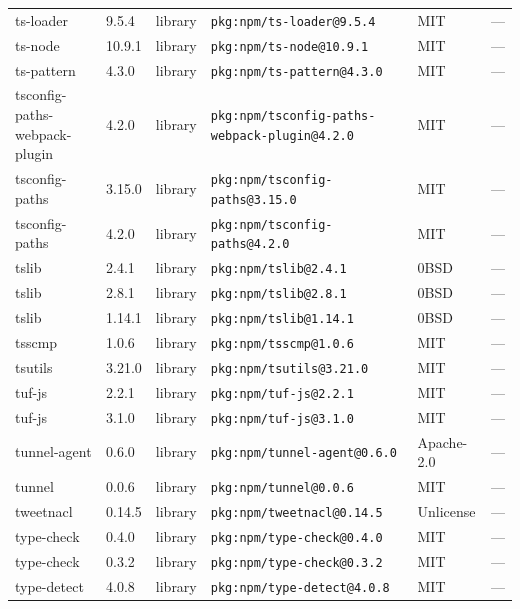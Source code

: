 \documentclass[11pt,a4paper]{article}
\begin{document}
\begin{longtable}{|p{4cm}|p{2cm}|p{1.6cm}|p{5cm}|p{1.5cm}|p{3.5cm}|}
\raggedright ts-loader & 9.5.4 & library & \small\texttt{pkg:npm/ts-loader@9.5.4} & MIT & \small — \\
\raggedright ts-node & 10.9.1 & library & \small\texttt{pkg:npm/ts-node@10.9.1} & MIT & \small — \\
\raggedright ts-pattern & 4.3.0 & library & \small\texttt{pkg:npm/ts-pattern@4.3.0} & MIT & \small — \\
\raggedright tsconfig-paths-webpack-plugin & 4.2.0 & library & \small\texttt{pkg:npm/tsconfig-paths-webpack-plugin@4.2.0} & MIT & \small — \\
\raggedright tsconfig-paths & 3.15.0 & library & \small\texttt{pkg:npm/tsconfig-paths@3.15.0} & MIT & \small — \\
\raggedright tsconfig-paths & 4.2.0 & library & \small\texttt{pkg:npm/tsconfig-paths@4.2.0} & MIT & \small — \\
\raggedright tslib & 2.4.1 & library & \small\texttt{pkg:npm/tslib@2.4.1} & 0BSD & \small — \\
\raggedright tslib & 2.8.1 & library & \small\texttt{pkg:npm/tslib@2.8.1} & 0BSD & \small — \\
\raggedright tslib & 1.14.1 & library & \small\texttt{pkg:npm/tslib@1.14.1} & 0BSD & \small — \\
\raggedright tsscmp & 1.0.6 & library & \small\texttt{pkg:npm/tsscmp@1.0.6} & MIT & \small — \\
\raggedright tsutils & 3.21.0 & library & \small\texttt{pkg:npm/tsutils@3.21.0} & MIT & \small — \\
\raggedright tuf-js & 2.2.1 & library & \small\texttt{pkg:npm/tuf-js@2.2.1} & MIT & \small — \\
\raggedright tuf-js & 3.1.0 & library & \small\texttt{pkg:npm/tuf-js@3.1.0} & MIT & \small — \\
\raggedright tunnel-agent & 0.6.0 & library & \small\texttt{pkg:npm/tunnel-agent@0.6.0} & Apache-2.0 & \small — \\
\raggedright tunnel & 0.0.6 & library & \small\texttt{pkg:npm/tunnel@0.0.6} & MIT & \small — \\
\raggedright tweetnacl & 0.14.5 & library & \small\texttt{pkg:npm/tweetnacl@0.14.5} & Unlicense & \small — \\
\raggedright type-check & 0.4.0 & library & \small\texttt{pkg:npm/type-check@0.4.0} & MIT & \small — \\
\raggedright type-check & 0.3.2 & library & \small\texttt{pkg:npm/type-check@0.3.2} & MIT & \small — \\
\raggedright type-detect & 4.0.8 & library & \small\texttt{pkg:npm/type-detect@4.0.8} & MIT & \small — \\

\end{longtable}
\end{document}
